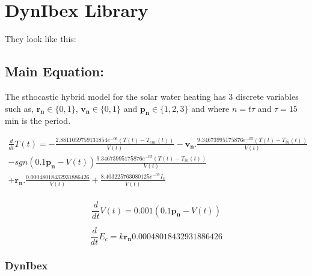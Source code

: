 \documentclass[12pt]{article}
\begin{document}
\newcommand{\tcont}{\ensuremath{T(t)}}
\newcommand{\vcont}{\ensuremath{V(t)}}
\newcommand{\tenv}{\ensuremath{T_{env}(t)}}
\newcommand{\tin}{\ensuremath{T_{in}(t)}}
\newcommand{\haux}{\ensuremath{P_{aux}}}
\newcommand{\irradiance}{\ensuremath{I_{e}}}

\newcommand{\energycon}{\ensuremath{E_{c}}}


\section*{DynIbex Library}

They look like this:




\subsection{Main Equation:}

The sthocastic hybrid model for the solar water heating has 3 discrete variables 
such as, $\boldsymbol{r_{n}} \in \{ 0,1 \}$, $\boldsymbol{v_{n}} \in \{0,1\}$ and 
$\boldsymbol{p_{n}} \in \{ 1,2,3\}  $ and where $n = t\tau$ and $\tau = 15$ min  is the period.

\begin{equation}
    \begin{aligned}
        \frac{ d }{dt}\tcont = -\frac{2.8811059759131854e^{-06}(\tcont-\tenv)}{\vcont}  
        - \boldsymbol{v_{n}}.\frac{9.34673995175876e^{-05}(\tcont-\tin)}{\vcont} \\
        - sgn(0.1\boldsymbol{p_{n}} - \vcont)\frac{9.34673995175876e^{-05}(\tcont-\tin)}{\vcont} \\
                        + \boldsymbol{r_{n}}.\frac{0.00048018432931886426}{\vcont} +
                        \frac{8.403225763080125e^{-07}\irradiance}{\vcont} \\
    \end{aligned}
\end{equation}

\begin{equation}
    \frac{d}{dt}\vcont = 0.001(0.1\boldsymbol{p_{n}} - \vcont)    
\end{equation}


\begin{equation}
    \frac{d}{dt}\energycon = k\boldsymbol{r_{n}}0.00048018432931886426
\end{equation}

\subsubsection{DynIbex}
\end{document}
